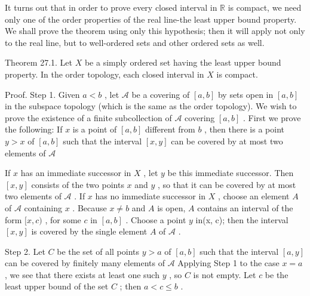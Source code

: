 It turns out that in order to prove every closed interval in \(\mathbb{R}\) is compact, we need only one of the order properties of the real line-the least upper bound property. We shall prove the theorem using only this hypothesis; then it will apply not only to the real line, but to well-ordered sets and other ordered sets as well.

Theorem 27.1. Let \(X\) be a simply ordered set having the least upper bound property. In the order topology, each closed interval in \(X\) is compact.

Proof. Step 1. Given \(a < b\) , let \(\mathcal{A}\) be a covering of \(\left\lbrack  {a,b}\right\rbrack\) by sets open in \(\left\lbrack  {a,b}\right\rbrack\) in the subspace topology (which is the same as the order topology). We wish to prove the existence of a finite subcollection of \(\mathcal{A}\) covering \(\left\lbrack  {a,b}\right\rbrack\) . First we prove the following: If \(x\) is a point of \(\left\lbrack  {a,b}\right\rbrack\) different from \(b\) , then there is a point \(y > x\) of \(\left\lbrack  {a,b}\right\rbrack\) such that the interval \(\left\lbrack  {x,y}\right\rbrack\) can be covered by at most two elements of \(\mathcal{A}\)

If \(x\) has an immediate successor in \(X\) , let \(y\) be this immediate successor. Then \(\left\lbrack  {x,y}\right\rbrack\) consists of the two points \(x\) and \(y\) , so that it can be covered by at most two elements of \(\mathcal{A}\) . If \(x\) has no immediate successor in \(X\) , choose an element \(A\) of \(\mathcal{A}\) containing \(x\) . Because \(x \neq  b\) and \(A\) is open, \(A\) contains an interval of the form \(\lbrack x,c)\) , for some \(c\) in \(\left\lbrack  {a,b}\right\rbrack\) . Choose a point \(y\) in(x, c); then the interval \(\left\lbrack  {x,y}\right\rbrack\) is covered by the single element \(A\) of \(\mathcal{A}\) .

Step 2. Let \(C\) be the set of all points \(y > a\) of \(\left\lbrack  {a,b}\right\rbrack\) such that the interval \(\left\lbrack  {a,y}\right\rbrack\) can be covered by finitely many elements of \(\mathcal{A}\) Applying Step 1 to the case \(x = a\) , we see that there exists at least one such \(y\) , so \(C\) is not empty. Let \(c\) be the least upper bound of the set \(C\) ; then \(a < c \leq  b\) .

